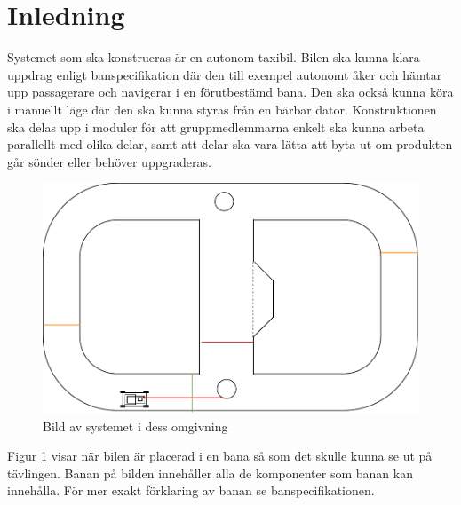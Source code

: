 \documentclass[systemskiss/skiss.tex]{subfiles}
\begin{document}
\section{Inledning}
Systemet som ska konstrueras är en autonom taxibil. Bilen ska kunna klara
uppdrag enligt banspecifikation där den till exempel autonomt åker och hämtar
upp passagerare och navigerar i en förutbestämd bana. Den ska också kunna köra i manuellt läge där den ska kunna
styras från en bärbar dator. Konstruktionen ska delas upp i moduler för att gruppmedlemmarna enkelt ska kunna arbeta parallellt med olika delar, samt att delar ska vara lätta att byta ut om produkten går sönder eller behöver uppgraderas.

\begin{figure}[h]
    \centering
    \includegraphics[width=0.6\linewidth]{systemskiss/figures/systemomgivning.pdf}
    \caption{Bild av systemet i dess omgivning}
    \label{fig:omgivning}
\end{figure}
\noindent
Figur \ref{fig:omgivning} visar när bilen är placerad i en bana så som det
skulle kunna se ut på tävlingen. Banan på bilden innehåller alla de komponenter
som banan kan innehålla. För mer exakt förklaring av banan se banspecifikationen.
\end{document}
